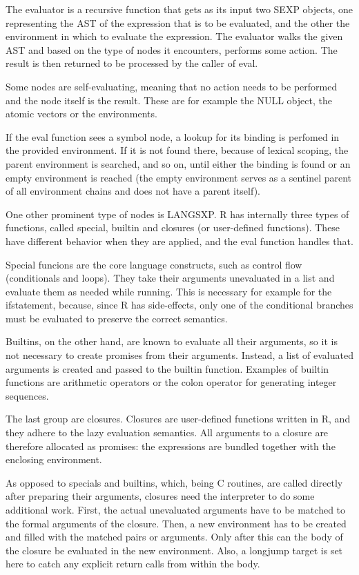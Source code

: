 {The evaluator is a recursive function that gets as its input two SEXP objects, one representing the AST of the expression that is to be evaluated, and the other the environment in which to evaluate the expression. The evaluator walks the given AST and based on the type of nodes it encounters, performs some action. The result is then returned to be processed by the caller of eval.

Some nodes are self-evaluating, meaning that no action needs to be performed and the node itself is the result. These are for example the NULL object, the atomic vectors or the environments.

If the eval function sees a symbol node, a lookup for its binding is perfomed in the provided environment. If it is not found there, because of lexical scoping, the parent environment is searched, and so on, until either the binding is found or an empty environment is reached (the empty environment serves as a sentinel parent of all environment chains and does not have a parent itself).

One other prominent type of nodes is LANGSXP. R has internally three types of functions, called special, builtin and closures (or user-defined functions). These have different behavior when they are applied, and the eval function handles that.

Special funcions are the core language constructs, such as control flow (conditionals and loops). They take their arguments unevaluated in a list and evaluate them as needed while running. This is necessary for example for the if\todo[verb] statement, because, since R has side-effects, only one of the conditional branches must be evaluated to preserve the correct semantics.

Builtins, on the other hand, are known to evaluate all their arguments, so it is not necessary to create promises from their arguments. Instead, a list of evaluated arguments is created and passed to the builtin function. Examples of builtin functions are arithmetic operators or the colon operator for generating integer sequences.

The last group are closures. Closures are user-defined functions written in R, and they adhere to the lazy evaluation semantics. All arguments to a closure are therefore allocated as promises: the expressions are bundled together with the enclosing environment.

As opposed to specials and builtins, which, being C routines, are called directly after preparing their arguments, closures need the interpreter to do some additional work. First, the actual unevaluated arguments have to be matched to the formal arguments of the closure. Then, a new environment has to be created and filled with the matched pairs or arguments. Only after this can the body of the closure be evaluated in the new environment. Also, a longjump target is set here to catch any explicit return calls from within the body.

}
